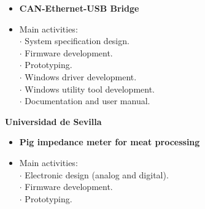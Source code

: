 \documentclass[9pt]{extarticle}
\begin{document}
\begin{itemize}
\item[\textbf{}]{\textbf{CAN-Ethernet-USB Bridge}}
\item[\textbf{}]{Main activities:}\\
$\cdot${ System specification design.}\\
$\cdot${ Firmware development.}\\
$\cdot${ Prototyping.}\\
$\cdot${ Windows driver development.}\\
$\cdot${ Windows utility tool development.}\\
$\cdot${ Documentation and user manual.}\\
\end{itemize}


\textbf{Universidad de Sevilla}\\
\begin{itemize}
\item[\textbf{}]{\textbf{Pig impedance meter for meat processing}}
\item[\textbf{}]{Main activities:}\\
$\cdot${ Electronic design (analog and digital).}\\
$\cdot${ Firmware development.}\\
$\cdot${ Prototyping.}\\
\end{itemize}
\end{document}
